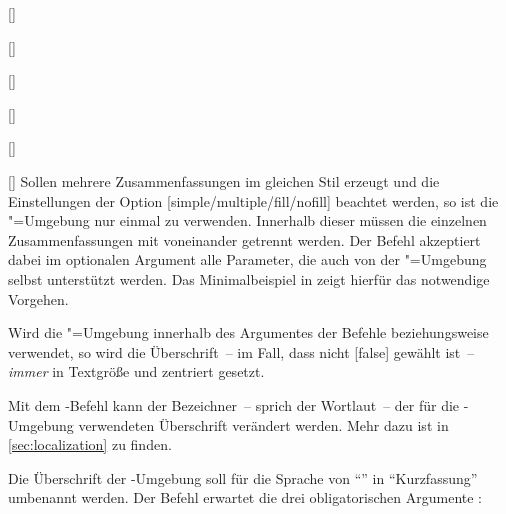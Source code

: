 \begin{Declaration*}{}
\begin{Declaration*}{}
\begin{Declaration*}{}
\begin{Declaration}{[]}
\begin{Declaration}[v2.02]{}
\begin{Declaration}{[]}
\begin{Declaration}[v2.02]{%
  []%
}
\begin{Declaration}[v2.02]{%
  []%
}
\begin{Declaration}{[]}
\begin{Declaration}{[\PSet]}{%
}
Sollen mehrere Zusammenfassungen im gleichen Stil erzeugt und die Einstellungen 
der Option [simple/multiple/fill/nofill] beachtet werden, so 
ist die "=Umgebung nur einmal zu verwenden. Innerhalb 
dieser müssen die einzelnen Zusammenfassungen mit  
voneinander getrennt werden. Der Befehl akzeptiert dabei im optionalen Argument 
alle Parameter, die auch von der "=Umgebung selbst 
unterstützt werden. Das Minimalbeispiel in  
zeigt hierfür das notwendige Vorgehen.

Wird die "=Umgebung innerhalb des Argumentes der Befehle 
 beziehungsweise  verwendet, 
so wird die Überschrift~-- im Fall, dass nicht [false] gewählt 
ist~-- \emph{immer} in Textgröße und zentriert gesetzt.
\end{Declaration}
\end{Declaration}
\end{Declaration}
\end{Declaration}
\end{Declaration}
\end{Declaration}
\end{Declaration}

Mit dem \KOMAScript-Befehl  kann der Bezeichner~-- 
sprich der Wortlaut~-- der für die -Umgebung verwendeten 
Überschrift verändert werden. Mehr dazu ist in \autoref{sec:localization} zu 
finden.
%
\begin{Example}
Die Überschrift der -Umgebung soll für die Sprache 
 von \enquote{\abstractname} in \enquote{Kurzfassung} umbenannt 
werden. Der Befehl  erwartet die drei obligatorischen 
Argumente :
\begin{Code}[escapechar=§]
\end{Code}
\end{Example}
%



\end{Declaration*}
\end{Declaration*}
\end{Declaration*}
